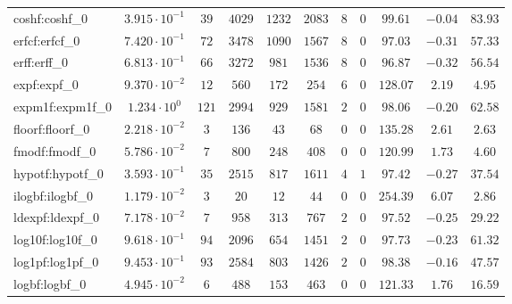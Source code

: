 \begin{tabular}{|l|c|c|c|c|c|c|c|c|c|c|}
coshf:coshf\_0               & $ 3.915 \cdot 10^{-1} $ & $ 39     $ & $ 4029  $ & $ 1232  $ & $ 2083  $ & $ 8   $ & $ 0 $ & $ 99.61       $ & $ -0.04   $ & $ 83.93   $ \\
erfcf:erfcf\_0               & $ 7.420 \cdot 10^{-1} $ & $ 72     $ & $ 3478  $ & $ 1090  $ & $ 1567  $ & $ 8   $ & $ 0 $ & $ 97.03       $ & $ -0.31   $ & $ 57.33   $ \\
erff:erff\_0                 & $ 6.813 \cdot 10^{-1} $ & $ 66     $ & $ 3272  $ & $ 981   $ & $ 1536  $ & $ 8   $ & $ 0 $ & $ 96.87       $ & $ -0.32   $ & $ 56.54   $ \\
expf:expf\_0                 & $ 9.370 \cdot 10^{-2} $ & $ 12     $ & $ 560   $ & $ 172   $ & $ 254   $ & $ 6   $ & $ 0 $ & $ 128.07      $ & $ 2.19    $ & $ 4.95    $ \\
expm1f:expm1f\_0             & $ 1.234 \cdot 10^{0}  $ & $ 121    $ & $ 2994  $ & $ 929   $ & $ 1581  $ & $ 2   $ & $ 0 $ & $ 98.06       $ & $ -0.20   $ & $ 62.58   $ \\
floorf:floorf\_0             & $ 2.218 \cdot 10^{-2} $ & $ 3      $ & $ 136   $ & $ 43    $ & $ 68    $ & $ 0   $ & $ 0 $ & $ 135.28      $ & $ 2.61    $ & $ 2.63    $ \\
fmodf:fmodf\_0               & $ 5.786 \cdot 10^{-2} $ & $ 7      $ & $ 800   $ & $ 248   $ & $ 408   $ & $ 0   $ & $ 0 $ & $ 120.99      $ & $ 1.73    $ & $ 4.60    $ \\
hypotf:hypotf\_0             & $ 3.593 \cdot 10^{-1} $ & $ 35     $ & $ 2515  $ & $ 817   $ & $ 1611  $ & $ 4   $ & $ 1 $ & $ 97.42       $ & $ -0.27   $ & $ 37.54   $ \\
ilogbf:ilogbf\_0             & $ 1.179 \cdot 10^{-2} $ & $ 3      $ & $ 20    $ & $ 12    $ & $ 44    $ & $ 0   $ & $ 0 $ & $ 254.39      $ & $ 6.07    $ & $ 2.86    $ \\
ldexpf:ldexpf\_0             & $ 7.178 \cdot 10^{-2} $ & $ 7      $ & $ 958   $ & $ 313   $ & $ 767   $ & $ 2   $ & $ 0 $ & $ 97.52       $ & $ -0.25   $ & $ 29.22   $ \\
log10f:log10f\_0             & $ 9.618 \cdot 10^{-1} $ & $ 94     $ & $ 2096  $ & $ 654   $ & $ 1451  $ & $ 2   $ & $ 0 $ & $ 97.73       $ & $ -0.23   $ & $ 61.32   $ \\
log1pf:log1pf\_0             & $ 9.453 \cdot 10^{-1} $ & $ 93     $ & $ 2584  $ & $ 803   $ & $ 1426  $ & $ 2   $ & $ 0 $ & $ 98.38       $ & $ -0.16   $ & $ 47.57   $ \\
logbf:logbf\_0               & $ 4.945 \cdot 10^{-2} $ & $ 6      $ & $ 488   $ & $ 153   $ & $ 463   $ & $ 0   $ & $ 0 $ & $ 121.33      $ & $ 1.76    $ & $ 16.59   $ \\

\end{tabular}
